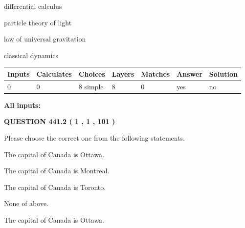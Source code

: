 \documentclass[12pt]{article}
\begin{document}
 
differential calculus
 
 
particle theory of light
 
 
law of universal gravitation
 
 
classical dynamics
 
 
\noindent{}
 
 
   
   
   
   
\noindent\begin{tabular}{|l|l|l|l|l|l|l|}
 \hline
Inputs & Calculates & Choices & Layers & Matches & Answer & Solution \\ \hline
 0  & 
 0  & 
 8
  simple  
  & 
 8  & 
 0  & 
  yes & 
  no 
  \\ \hline
 \end{tabular}
   
   
   
   
\noindent{}
   
   
   
   
\noindent\vspace{0.1in}\hspace{-0.08in} {\textbf{\Large{All inputs: }}}
   
   
  
\vspace{0.2in}
  
{\textbf{\Large{QUESTION
441.2 
 ( 1 , 1 , 101 )
}}}
  
  
Please choose the correct one from the following statements.
 
 
The capital of Canada is Ottawa.
 
 
The capital of Canada is Montreal.
 
 
The capital of Canada is Toronto.
 
 
 None of above.
 
 
\noindent{}
 
 
The capital of Canada is Ottawa.
 
 
\noindent{}
 
\end{document}
